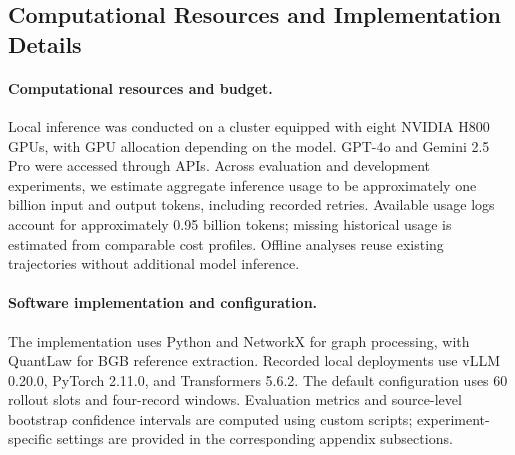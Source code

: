 \begin{revadded}
\subsection{Computational Resources and Implementation Details}
\label{app:compute_implementation}

\paragraph{Computational resources and budget.}
Local inference was conducted on a cluster equipped with eight NVIDIA H800 GPUs, with GPU allocation depending on the model. GPT-4o and Gemini 2.5 Pro were accessed through APIs. Across evaluation and development experiments, we estimate aggregate inference usage to be approximately one billion input and output tokens, including recorded retries. Available usage logs account for approximately 0.95 billion tokens; missing historical usage is estimated from comparable cost profiles. Offline analyses reuse existing trajectories without additional model inference.

\paragraph{Software implementation and configuration.}
The implementation uses Python and NetworkX for graph processing, with QuantLaw for BGB reference extraction. Recorded local deployments use vLLM 0.20.0, PyTorch 2.11.0, and Transformers 5.6.2. The default \samcgs{} configuration uses 60 rollout slots and four-record windows. Evaluation metrics and source-level bootstrap confidence intervals are computed using custom scripts; experiment-specific settings are provided in the corresponding appendix subsections.
\end{revadded}
